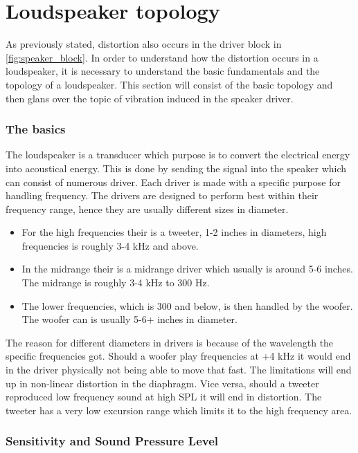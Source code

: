\section{Loudspeaker topology}

As previously stated, distortion also occurs in the driver block in \autoref{fig:speaker_block}. In order to understand how the distortion occurs in a loudspeaker, it is necessary to understand the basic fundamentals and the topology of a loudspeaker. This section will consist of the basic topology and then glans over the topic of vibration induced in the speaker driver.

\subsubsection*{The basics}
The loudspeaker is a transducer which purpose is to convert the electrical energy into acoustical energy. This is done by sending the signal into the speaker which can consist of numerous driver. Each driver is made with a specific purpose for handling frequency. The drivers are designed to perform best within their frequency range, hence they are usually different sizes in diameter.
\begin{itemize}
\item[] For the high frequencies their is a tweeter, 1-2 inches in diameters, high frequencies is roughly 3-4 kHz and above.
\item[] In the midrange their is a midrange driver which usually is around 5-6 inches. The midrange is roughly 3-4 kHz to 300 Hz. 
\item[] The lower frequencies, which is 300 and below, is then handled by the woofer. The woofer can is usually 5-6+ inches in diameter.
\end{itemize}
The reason for different diameters in drivers is because of the wavelength the specific frequencies got. Should a woofer play frequencies at +4 kHz it would end in the driver physically not being able to move that fast. The limitations will end up in non-linear distortion in the diaphragm. Vice versa, should a tweeter reproduced low frequency sound at high \gls{SPL} it will end in distortion. The tweeter has a very low excursion range which limits it to the high frequency area.

\subsubsection*{Sensitivity and Sound Pressure Level}

